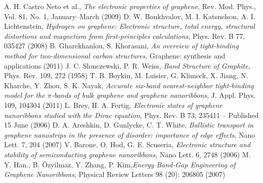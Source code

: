 \begin{thebibliography}{99}
 A. H. Castro Neto et al., \textit{The electronic properties of graphene}, Rev. Mod. Phys., Vol. 81, No. 1, January–March (2009)
 D. W. Boukhvalov, M. I. Katsnelson, A. I. Lichtenstein, \textit{Hydrogen on graphene: Electronic structure, total energy, structural distortions and magnetism
from first-principles calculations}, Phys. Rev. B 77, 035427 (2008)
 B. Gharekhanlou, S. Khorasani, \textit{An overview of tight-binding method for two-dimensional carbon structures}, Graphene: synthesis and applications (2011)
 J. C. Slonczewski, P. R. Weiss, \textit{Band Structure of Graphite}, Phys. Rev. 109, 272 (1958)
 T. B. Boykin, M. Luisier, G. Klimeck, X. Jiang, N. Kharche, Y. Zhou, S. K. Nayak, \textit{Accurate six-band nearest-neighbor tight-binding model for the $\pi$-bands of bulk graphene and graphene nanoribbons}, J. Appl. Phys. 109, 104304 (2011)
 L. Brey, H. A. Fertig, \textit{Electronic states of graphene nanoribbons studied with the Dirac equation}, Phys. Rev. B 73, 235411 – Published 15 June (2006)
 D. A. Areshkin, D. Gunlycke, C. T. White, \textit{Ballistic transport in graphene nanostrips in the presence of disorder: importance of edge effects}, Nano Lett. 7, 204 (2007)
 V. Barone, O. Hod, G. E. Scuseria, \textit{Electronic structure and stability of semiconducting graphene nanoribbons}, Nano Lett. 6, 2748 (2006)
 M. Y. Han., B. Özyilmaz, Y. Zhang, P. Kim,\textit{Energy Band-Gap Engineering of Graphene Nanoribbons}, Physical Review Letters 98 (20): 206805 (2007)
\end{thebibliography}
